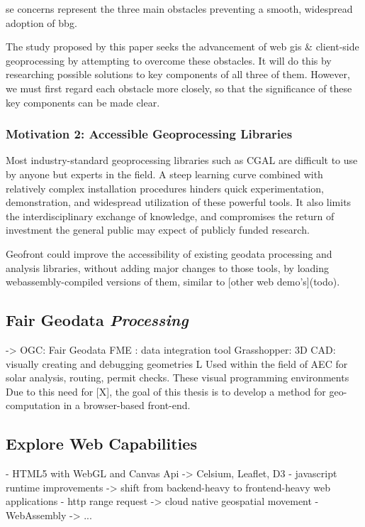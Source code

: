 se concerns represent the three main obstacles preventing a smooth, widespread adoption of \ac{bbg}. 

The study proposed by this paper seeks the advancement of web \ac{gis} \& client-side geoprocessing by attempting to overcome these obstacles. It will do this by researching possible solutions to key components of all three of them. However, we must first regard each obstacle more closely, so that the significance of these key components can be made clear. 

\subsubsection{Motivation 2: Accessible Geoprocessing Libraries}

Most industry-standard geoprocessing libraries such as CGAL are difficult to use by anyone but experts in the field. A steep learning curve combined with relatively complex installation procedures hinders quick experimentation, demonstration, and widespread utilization of these powerful tools. It also limits the interdisciplinary exchange of knowledge, and compromises the return of investment the general public may expect of publicly funded research.

Geofront could improve the accessibility of existing geodata processing and analysis libraries, without adding major changes to those tools, by loading webassembly-compiled versions of them, similar to [other web demo's](todo).








\subsection*{Fair Geodata \emph{Processing}}
-> OGC: Fair Geodata
\m{->} FME : data integration tool
\m{->} Grasshopper: 3D CAD: visually creating and debugging geometries
       L \m{->} Used within the field of AEC for solar analysis, routing, permit checks.
These visual programming environments 
Due to this need for [X], the goal of this thesis is to develop a method for geo-computation in a browser-based front-end. 


\subsection*{Explore Web Capabilities }

- HTML5 with WebGL and Canvas Api -> Celsium, Leaflet, D3
- javascript runtime improvements -> shift from backend-heavy to frontend-heavy web applications
- http range request -> cloud native geospatial movement 
- WebAssembly -> ...

